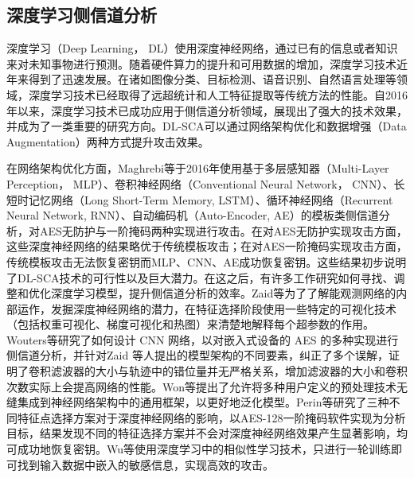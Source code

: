 {	\subsection{深度学习侧信道分析}
	
	深度学习（Deep Learning， DL）使用深度神经网络，通过已有的信息或者知识来对未知事物进行预测。随着硬件算力的提升和可用数据的增加，深度学习技术近年来得到了迅速发展。在诸如图像分类\citep{Szegedy17}、目标检测\citep{Girshick15}、语音识别\citep{Hinton12}、自然语言处理\citep{Radford18}等领域，深度学习技术已经取得了远超统计和人工特征提取等传统方法的性能。自2016年以来，深度学习技术已成功应用于侧信道分析领域，展现出了强大的技术效果，并成为了一类重要的研究方向。DL-SCA可以通过网络架构优化和数据增强（Data Augmentation）两种方式提升攻击效果。
	
	在网络架构优化方面，Maghrebi等\citep{Maghrebi16}于2016年使用基于多层感知器（Multi-Layer Perception， MLP）、卷积神经网络（Conventional Neural Network， CNN）、长短时记忆网络（Long Short-Term Memory, LSTM）、循环神经网络（Recurrent Neural Network, RNN）、自动编码机（Auto-Encoder, AE）的模板类侧信道分析，对AES无防护与一阶掩码两种实现进行攻击。在对AES无防护实现攻击方面，这些深度神经网络的结果略优于传统模板攻击；在对AES一阶掩码实现攻击方面，传统模板攻击无法恢复密钥而MLP、CNN、AE成功恢复密钥。这些结果初步说明了DL-SCA技术的可行性以及巨大潜力。在这之后，有许多工作研究如何寻找、调整和优化深度学习模型，提升侧信道分析的效率。Zaid等\citep{Zaid20}为了了解能观测网络的内部运作，发掘深度神经网络的潜力，在特征选择阶段使用一些特定的可视化技术（包括权重可视化、梯度可视化和热图）来清楚地解释每个超参数的作用。Wouters等\citep{Wouters20}研究了如何设计 CNN 网络，以对嵌入式设备的 AES 的多种实现进行侧信道分析，并针对Zaid 等人提出的模型架构的不同要素，纠正了多个误解，证明了卷积滤波器的大小与轨迹中的错位量并无严格关系，增加滤波器的大小和卷积次数实际上会提高网络的性能。Won等\citep{Won21}提出了允许将多种用户定义的预处理技术无缝集成到神经网络架构中的通用框架，以更好地泛化模型。Perin等\citep{Perin22}研究了三种不同特征点选择方案对于深度神经网络的影响，以AES-128一阶掩码软件实现为分析目标，结果发现不同的特征选择方案并不会对深度神经网络效果产生显著影响，均可成功地恢复密钥。Wu等\citep{Wu22}使用深度学习中的相似性学习技术，只进行一轮训练即可找到输入数据中嵌入的敏感信息，实现高效的攻击。
	
}
